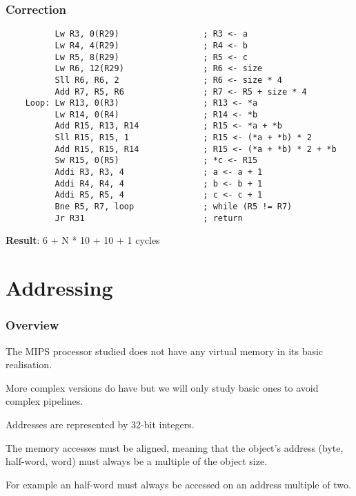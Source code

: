 \begin{frame}[containsverbatim]
  \frametitle{Correction}

  \begin{verbatim}
          Lw R3, 0(R29)                 ; R3 <- a
          Lw R4, 4(R29)                 ; R4 <- b
          Lw R5, 8(R29)                 ; R5 <- c
          Lw R6, 12(R29)                ; R6 <- size
          Sll R6, R6, 2                 ; R6 <- size * 4
          Add R7, R5, R6                ; R7 <- R5 + size * 4
    Loop: Lw R13, 0(R3)                 ; R13 <- *a
          Lw R14, 0(R4)                 ; R14 <- *b
          Add R15, R13, R14             ; R15 <- *a + *b
          Sll R15, R15, 1               ; R15 <- (*a + *b) * 2
          Add R15, R15, R14             ; R15 <- (*a + *b) * 2 + *b
          Sw R15, 0(R5)                 ; *c <- R15
          Addi R3, R3, 4                ; a <- a + 1
          Addi R4, R4, 4                ; b <- b + 1
          Addi R5, R5, 4                ; c <- c + 1
          Bne R5, R7, loop              ; while (R5 != R7)
          Jr R31                        ; return
  \end{verbatim}

  \textbf{Result}: 6 + N * 10 + 10 + 1 cycles
\end{frame}

%
%

\section{Addressing}


\begin{frame}
  \frametitle{Overview}

  The MIPS processor studied does not have any virtual memory in its basic
  realisation.

  \nl

  More complex versions do have but we will only study basic ones to
  avoid complex pipelines.

  \nl

  Addresses are represented by 32-bit integers.

  \nl

  The memory accesses must be aligned, meaning that the object's address
  (byte, half-word, word) must always be a multiple of the object size.

  \nl

  For example an half-word must always be accessed on an address multiple
  of two.
\end{frame}

